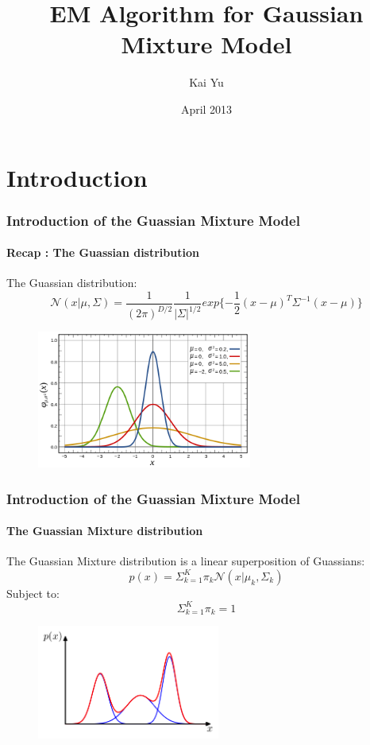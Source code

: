 \documentclass{beamer}
\title{EM Algorithm for Gaussian Mixture Model}
\author{Kai Yu}
\date{April 2013}
\begin{document}
\begin{frame}
\titlepage
\end{frame}

\section{Introduction}

\begin{frame}
\frametitle{Introduction of the Guassian Mixture Model}
\framesubtitle{Recap : The Guassian distribution}
The Guassian distribution:
\begin{equation}
\mathcal{N}(x | \mu, \Sigma) = \frac{1}{(2\pi)^{D/2}}\frac{1}{|\Sigma|^{1/2}}exp\{-\frac{1}{2}(x-\mu)^T\Sigma^{-1}(x-\mu)\}
\end{equation}
\begin{figure}
\includegraphics[width=200pt]{Guassian.png}
\end{figure}
\end{frame}

\begin{frame}
\frametitle{Introduction of the Guassian Mixture Model}
\framesubtitle{The Guassian Mixture distribution}
The Guassian Mixture distribution is a linear superposition of Guassians: 
\begin{equation}
p(x) = \Sigma^K_{k=1}\pi_k\mathcal{N}(x|\mu_k,\Sigma_k)
\end{equation}
Subject to:
\begin{equation}
\Sigma^K_{k=1}\pi_k = 1
\end{equation}
\begin{figure}
\includegraphics[width=170pt]{GMM-example2.png}\\
\end{figure}
\end{frame}
\end{document}
